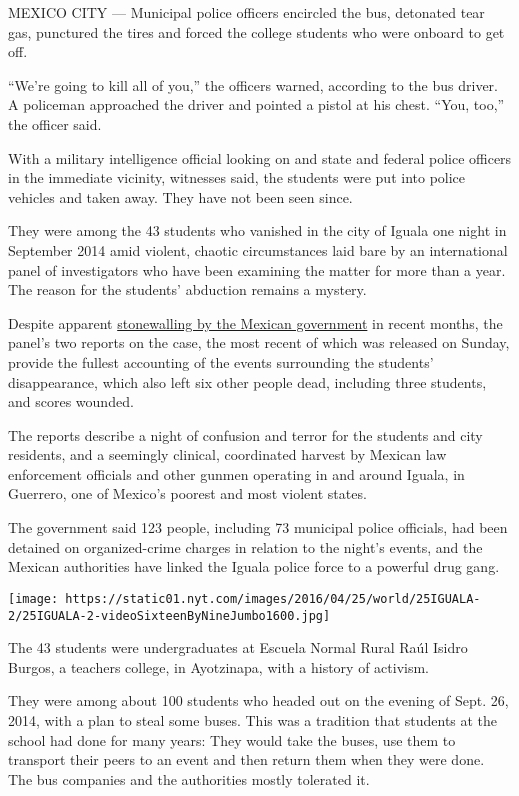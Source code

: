 MEXICO CITY --- Municipal police officers encircled the bus, detonated
tear gas, punctured the tires and forced the college students who were
onboard to get off.

``We're going to kill all of you,'' the officers warned, according to
the bus driver. A policeman approached the driver and pointed a pistol
at his chest. ``You, too,'' the officer said.

With a military intelligence official looking on and state and federal
police officers in the immediate vicinity, witnesses said, the students
were put into police vehicles and taken away. They have not been seen
since.

They were among the 43 students who vanished in the city of Iguala one
night in September 2014 amid violent, chaotic circumstances laid bare by
an international panel of investigators who have been examining the
matter for more than a year. The reason for the students' abduction
remains a mystery.

Despite apparent
\href{http://www.nytimes.com/2016/04/23/world/americas/investigators-say-mexico-has-thwarted-efforts-to-solve-students-disappearance.html?_r=0}{stonewalling
by the Mexican government} in recent months, the panel's two reports on
the case, the most recent of which was released on Sunday, provide the
fullest accounting of the events surrounding the students'
disappearance, which also left six other people dead, including three
students, and scores wounded.

The reports describe a night of confusion and terror for the students
and city residents, and a seemingly clinical, coordinated harvest by
Mexican law enforcement officials and other gunmen operating in and
around Iguala, in Guerrero, one of Mexico's poorest and most violent
states.

The government said 123 people, including 73 municipal police officials,
had been detained on organized-crime charges in relation to the night's
events, and the Mexican authorities have linked the Iguala police force
to a powerful drug gang.

\texttt{[image: https://static01.nyt.com/images/2016/04/25/world/25IGUALA-2/25IGUALA-2-videoSixteenByNineJumbo1600.jpg]}

The 43 students were undergraduates at Escuela Normal Rural Raúl Isidro
Burgos, a teachers college, in Ayotzinapa, with a history of activism.

They were among about 100 students who headed out on the evening of
Sept. 26, 2014, with a plan to steal some buses. This was a tradition
that students at the school had done for many years: They would take the
buses, use them to transport their peers to an event and then return
them when they were done. The bus companies and the authorities mostly
tolerated it.

